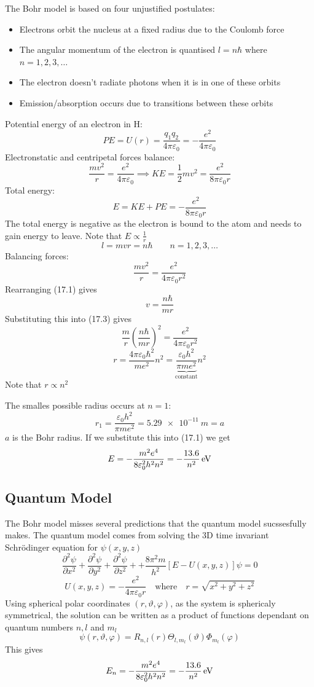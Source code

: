 \documentclass{article}
\newcommand{\pd}[3][]{\frac{\partial^{#1}{#2}}{\partial{#3}^{#1}}}
\newcommand{\hb}{\hbar}
\begin{document}
The Bohr model is based on four unjustified postulates:
\begin{itemize}
\item Electrons orbit the nucleus at a fixed radius due to the Coulomb force
\item The angular momentum of the electron is quantised \(l=n\hb\) where \(n=1,2,3,\dots\)
\item The electron doesn't radiate photons when it is in one of these orbits
\item Emission/absorption occurs due to transitions between these orbits
\end{itemize}
Potential energy of an electron in H:
\[PE=U(r)=\frac{q_1q_2}{4\pi\varepsilon_0}=-\frac{e^2}{4\pi\varepsilon_0}\]
Electronstatic and centripetal forces balance:
\[\frac{mv^2}{r}=\frac{e^2}{4\pi\varepsilon_0}\implies KE = \frac 12mv^2=\frac{e^2}{8\pi\varepsilon_0r}\]
Total energy:
\[E=KE+PE=-\frac{e^2}{8\pi\varepsilon_0r}\tag{17.1}\]
The total energy is negative as the electron is bound to the atom and needs to gain energy to leave. Note that \(E\propto\frac 1r\)
\[l=mvr=n\hb\qquad n=1,2,3,\dots\tag{17.2}\]
Balancing forces:
\[\frac{mv^2}{r}=\frac{e^2}{4\pi\varepsilon_0r^2}\tag{17.3}\]
Rearranging (17.1) gives
\[v=\frac{n\hb}{mr}\]
Substituting this into (17.3) gives
\[\frac mr\left(\frac{n\hb}{mr}\right)^2=\frac{e^2}{4\pi\varepsilon_0r^2}\]
\[r=\frac{4\pi\varepsilon_0\hb^2}{me^2}n^2=\underbrace{\frac{\varepsilon_0h^2}{\pi me^2}}_{\text{constant}}n^2\]
Note that \(r\propto n^2\)

The smalles possible radius occurs at \(n=1\):
\[r_1=\frac{\varepsilon_0h^2}{\pi me^2}=\SI{5.29e-11}{m}=a\]
\(a\) is the Bohr radius. If we substitute this into (17.1) we get
\[E=-\frac{m^2e^4}{8\varepsilon_0^2h^2n^2}=-\frac{13.6}{n^2}\mskip3mu\si{eV}\]

\subsection*{Quantum Model}

The Bohr model misses several predictions that the quantum model sucssesfully makes. The quantum model comes from solving the 3D time invariant Schr\"odinger equation for \(\psi(x,y,z)\)
\[\pd[2]{\psi}{x}+\pd[2]{\psi}{y}+\pd[2]{\psi}{z}++\frac{8\pi^2m}{h^2}[E-U(x,y,z)]\psi=0\]
\[U(x,y,z)=-\frac{e^2}{4\pi\varepsilon_0r}\quad\text{where}\quad r=\sqrt{x^2+y^2+z^2}\]
Using spherical polar coordinates \((r,\vartheta,\varphi)\), as the system is sphericaly symmetrical, the solution can be written as a product of functions dependant on quantum numbers \(n,l\) and \(m_l\)
\[\psi(r,\vartheta,\varphi)=R_{n,l}(r)\Theta_{l,m_l}(\vartheta)\Phi_{m_l}(\varphi)\]
This gives
\[E_n=-\frac{m^2e^4}{8\varepsilon_0^2h^2n^2}=-\frac{13.6}{n^2}\mskip3mu\si{eV}\]
\end{document}
